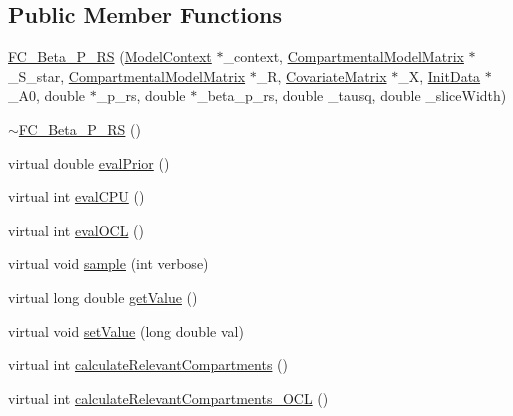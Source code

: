 \subsection*{Public Member Functions}
\begin{DoxyCompactItemize}
\item 
\hyperlink{classSpatialSEIR_1_1FC__Beta__P__RS_ab39ed13b5740506c5b505ddc10127570}{F\-C\-\_\-\-Beta\-\_\-\-P\-\_\-\-R\-S} (\hyperlink{classSpatialSEIR_1_1ModelContext}{Model\-Context} $\ast$\-\_\-context, \hyperlink{classSpatialSEIR_1_1CompartmentalModelMatrix}{Compartmental\-Model\-Matrix} $\ast$\-\_\-\-S\-\_\-star, \hyperlink{classSpatialSEIR_1_1CompartmentalModelMatrix}{Compartmental\-Model\-Matrix} $\ast$\-\_\-\-R, \hyperlink{classSpatialSEIR_1_1CovariateMatrix}{Covariate\-Matrix} $\ast$\-\_\-\-X, \hyperlink{classSpatialSEIR_1_1InitData}{Init\-Data} $\ast$\-\_\-\-A0, double $\ast$\-\_\-p\-\_\-rs, double $\ast$\-\_\-beta\-\_\-p\-\_\-rs, double \-\_\-tausq, double \-\_\-slice\-Width)
\item 
\hyperlink{classSpatialSEIR_1_1FC__Beta__P__RS_afe2855aab7e504232715eb41ccc7be8c}{$\sim$\-F\-C\-\_\-\-Beta\-\_\-\-P\-\_\-\-R\-S} ()
\item 
virtual double \hyperlink{classSpatialSEIR_1_1FC__Beta__P__RS_af41981a47b1b923c1245329a871f28a9}{eval\-Prior} ()
\item 
virtual int \hyperlink{classSpatialSEIR_1_1FC__Beta__P__RS_a48e4e95be2abde217b71993c2b08e3da}{eval\-C\-P\-U} ()
\item 
virtual int \hyperlink{classSpatialSEIR_1_1FC__Beta__P__RS_ae51ca0e2ad990cd519fd62cf896c23ca}{eval\-O\-C\-L} ()
\item 
virtual void \hyperlink{classSpatialSEIR_1_1FC__Beta__P__RS_ae1a9ec2e9336c7c77106ff525d69ec64}{sample} (int verbose)
\item 
virtual long double \hyperlink{classSpatialSEIR_1_1FC__Beta__P__RS_a3017d4d02d954375869fe5d8e7e301ea}{get\-Value} ()
\item 
virtual void \hyperlink{classSpatialSEIR_1_1FC__Beta__P__RS_a788189d97ce2ffd40dc483a74ed63312}{set\-Value} (long double val)
\item 
virtual int \hyperlink{classSpatialSEIR_1_1FC__Beta__P__RS_a0edc8515a51962383536f8bf779ce194}{calculate\-Relevant\-Compartments} ()
\item 
virtual int \hyperlink{classSpatialSEIR_1_1FC__Beta__P__RS_a156069877b44b2d1b3ecd94bf019bf6d}{calculate\-Relevant\-Compartments\-\_\-\-O\-C\-L} ()
\end{DoxyCompactItemize}
